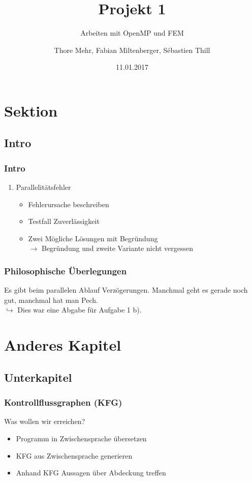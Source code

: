 \documentclass[german,notes,18pt]{beamer}
\title{Projekt 1}
\subtitle{Arbeiten mit OpenMP und FEM}
\author{Thore Mehr, Fabian Miltenberger, Sébastien Thill}
\date{11.01.2017}
\institute{Lehrstuhl für Rechnerarchitektur und Parallelverarbeitung (ITEC)}
\begin{document}
	
	\frame{\titlepage}
	
	\section{Sektion}
	\subsection{Intro}
	\begin{frame}
		\frametitle{Intro}
		
		\begin{enumerate}
			\item Parallelitätsfehler
			\begin{itemize}
				\item Fehlerursache beschreiben
				\item Testfall Zuverlässigkeit
				\item Zwei Mögliche Lösungen mit Begründung \\
				$\rightarrow$ Begründung und zweite Variante nicht vergessen
			\end{itemize}
		\end{enumerate}
	\end{frame}
	
	\begin{frame}
		\frametitle{Philosophische Überlegungen}
		Es gibt beim parallelen Ablauf Verzögerungen. Manchmal geht es gerade noch gut, manchmal hat man Pech.
		\\
		\vspace{1cm}
		\onslide<2->
		$\hookrightarrow$ Dies war eine Abgabe für Aufgabe 1 b).
	\end{frame}
	
	
	
	\section{Anderes Kapitel}
	\subsection{Unterkapitel}
	\begin{frame}
		\frametitle{Kontrollflussgraphen (KFG)}
		
		Was wollen wir erreichen?
		\begin{itemize}
			\item Programm in Zwischensprache übersetzen
			\item KFG aus Zwischensprache generieren
			\item Anhand KFG Aussagen über Abdeckung treffen
		\end{itemize}
	\end{frame}
\end{document}
